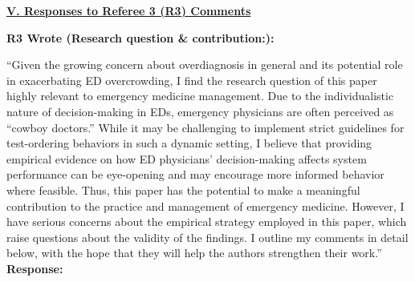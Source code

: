 \documentclass[11pt]{article}
\newenvironment{quote2}
{ \bigskip
\noindent
         \small\em
         \baselineskip=14pt
}
\newcommand{\1}{\hbox{\rm 1\kern-.35em 1}}
\begin{document}
{{{{%
\clearpage





\pagestyle{fancy}
\fancyhead{}
\renewcommand{\headrulewidth}{0pt}

\noindent\underline{\textbf{V. Responses to Referee 3 (R3) Comments}}



\begin{quote2}
\textbf{R3 Wrote (Research question \& contribution:):}  

\noindent``Given the growing concern about overdiagnosis in general and its potential role in exacerbating ED overcrowding, I find the research question of this paper highly relevant to emergency medicine management. Due to the individualistic nature of decision-making in EDs, emergency physicians are often perceived as “cowboy doctors.” While it may be challenging to implement strict guidelines for test-ordering behaviors in such a dynamic setting, I believe that providing empirical evidence on how ED physicians’ decision-making affects system performance can be eye-opening and may encourage more informed behavior where feasible. Thus, this paper has the potential to make a meaningful contribution to the practice and management of emergency medicine. However, I have serious concerns about the empirical strategy employed in this paper, which raise questions about the validity of the findings. I outline my comments in detail below, with the hope that they will help the authors strengthen their work.”
\end{quote2}

\noindent\textbf{Response:} \color{blue}{We sincerely appreciate the reviewer's recognition of our paper's relevance to emergency medicine management and the important problem of overdiagnosis in contributing to ED overcrowding. Your characterization of emergency physicians as "cowboy doctors" whose individualistic decision-making requires empirical scrutiny perfectly captures the motivation for our study. We agree that while implementing strict protocols in dynamic ED settings is challenging, providing rigorous evidence about the consequences of different practice patterns can inform better decision-making.

}}}}}
\end{document}
